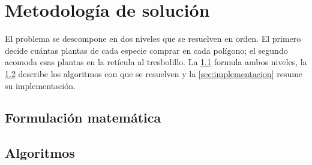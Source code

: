 \section{Metodología de solución}
\label{sec:metodologia}

El problema se descompone en dos niveles que se resuelven en orden. El primero decide cuántas plantas de cada especie comprar en cada polígono; el segundo acomoda esas plantas en la retícula al tresbolillo. La \cref{subsec:formulacion} formula ambos niveles, la \cref{subsec:algoritmos} describe los algoritmos con que se resuelven y la \cref{sec:implementacion} resume su implementación.

\subsection{Formulación matemática}
\label{subsec:formulacion}




\subsection{Algoritmos}
\label{subsec:algoritmos}




